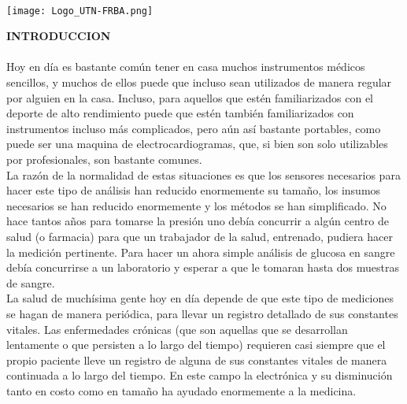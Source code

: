 \documentclass[11pt]{report}
\begin{document}
\begin{titlepage}
		
		\hfill
		\\[5cm]
		\hfill
		\vfill\vfill
		\texttt{[image: Logo\_UTN-FRBA.png]}\\[1cm] %
		
		
		\vfill %
		
	\end{titlepage}


\newpage
\noindent \Large \textbf{INTRODUCCION} \\
\\
Hoy en día es bastante común tener en casa muchos instrumentos médicos sencillos, y muchos de ellos puede que incluso sean  utilizados de manera regular por alguien en la casa. Incluso, para aquellos que estén familiarizados con el deporte de alto rendimiento puede que estén también familiarizados con instrumentos incluso más complicados, pero aún así bastante portables, como puede ser una maquina de electrocardiogramas, que, si bien son solo utilizables por profesionales, son bastante comunes. \\

La razón de la normalidad de estas situaciones es que los sensores necesarios para hacer este tipo de análisis han reducido enormemente su tamaño, los insumos necesarios se han reducido enormemente y los métodos se han simplificado. No hace tantos años para tomarse la presión uno debía concurrir a algún centro de salud (o
farmacia) para que un trabajador de la salud, entrenado, pudiera hacer la medición pertinente.  Para hacer un ahora simple análisis de glucosa en sangre debía  concurrirse a un laboratorio y esperar a que le tomaran hasta dos muestras de sangre.\\

La salud de muchísima gente hoy en día depende de que este tipo de mediciones se hagan de manera periódica, para llevar un registro detallado de sus constantes vitales. Las enfermedades crónicas (que son aquellas que se desarrollan lentamente o que persisten a lo largo del tiempo) requieren casi siempre que el propio paciente lleve un registro de
alguna de sus constantes vitales de manera continuada a lo largo del tiempo. En este campo la electrónica y su disminución tanto en costo como en tamaño ha ayudado enormemente a la medicina.\\
\end{document}
